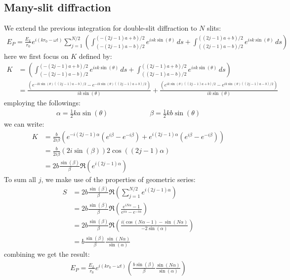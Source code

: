 \documentclass[11pt]{book}
\theoremstyle{break}
\theoremstyle{break}
\begin{document}
\subsection{Many-slit diffraction}
We extend the previous integration for double-slit diffraction to $N$ slits:
\begin{align*}
E_P = \frac{E_L}{r_0}e^{i(kr_0 - \omega t)}\sum_{j=1}^{N/2} \left( \int_{(-(2j-1)a-b)/2}^{(-(2j-1)a+b)/2}e^{isk\sin(\theta)}\, ds + \int_{((2j-1)a-b)/2}^{((2j-1)a+b)/2}e^{isk\sin(\theta)}\, ds\right)
\end{align*}
here we first focus on $K$ defined by:
\begin{align*}
K &= \left( \int_{(-(2j-1)a-b)/2}^{(-(2j-1)a+b)/2}e^{isk\sin(\theta)}\, ds + \int_{((2j-1)a-b)/2}^{((2j-1)a+b)/2}e^{isk\sin(\theta)}\, ds\right)\\
&= \frac{\left( e^{-ik\sin(\theta)((2j-1)a-b)/2} - e^{-ik\sin(\theta)((2j-1)a+b)/2} \right)}{ik\sin(\theta)} + \frac{\left(e^{ik\sin(\theta)((2j-1)a+b)/2}-e^{ik\sin(\theta)((2j-1)a-b)/2}\right)}{ik\sin(\theta)}
\end{align*}
employing the followings:
\begin{align*}
\alpha = \frac{1}{2}ka\sin(\theta) \qquad\qquad\qquad \beta = \frac{1}{2}kb \sin(\theta)
\end{align*}
we can write:
\begin{align*}
K 
&= \frac{b}{2i\beta}\left( e^{-i(2j-1)\alpha}\left( e^{i\beta} - e^{-i\beta}\right) + e^{i(2j-1)\alpha}\left( e^{i\beta} - e^{-i\beta}\right)\right)\\ 
&= \frac{b}{2i\beta}(2i\sin(\beta))  2\cos((2j-1)\alpha)\\
&= 2b \frac{\sin(\beta)}{\beta}\Re\left( e^{i(2j-1)\alpha}\right)
\end{align*}
To sum all $j$, we make use of the properties of geometric series:
\begin{align*}
S &= 2b \frac{\sin(\beta)}{\beta}\Re\left( \sum_{j=1}^{N/2}e^{i(2j-1)\alpha}\right)\\
&=  2b \frac{\sin(\beta)}{\beta}\Re\left(\frac{e^{iN\alpha}-1}{e^{i\alpha}-e^{-i\alpha}}  \right) \\
&=  2b \frac{\sin(\beta)}{\beta}\Re\left(\frac{i(\cos(N\alpha-1) - \sin(N\alpha)}{-2\sin(\alpha)} \right) \\
&= b \frac{\sin(\beta)}{\beta} \frac{\sin(N\alpha)}{\sin(\alpha)}
\end{align*}
combining we get the result:
\begin{align*}
E_P = \frac{E_L}{r_0}e^{i(kr_0-\omega t)}\left( \frac{b\sin(\beta)}{\beta}\frac{\sin(N\alpha)}{\sin(\alpha)}\right)
\end{align*}
\end{document}
